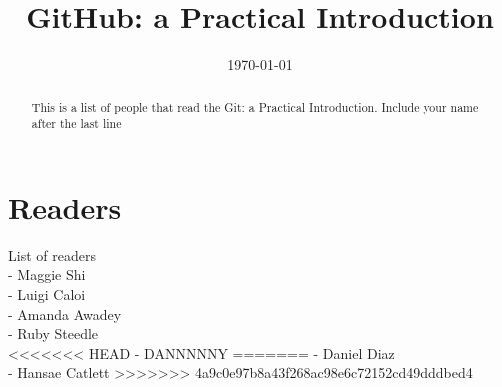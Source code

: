 \documentclass[12pt]{article}
\begin{document}
\title{GitHub: a Practical Introduction} 

\date{\today}

\maketitle 

\begin{abstract} 

	This is a list of people that read the Git: a Practical Introduction. Include your name after the last line
	
\end{abstract}

\section{Readers}
List of readers \\
- Maggie Shi \\
- Luigi Caloi  \\
- Amanda Awadey \\
- Ruby Steedle \\
<<<<<<< HEAD
- DANNNNNY
=======
- Daniel Diaz \\
- Hansae Catlett
>>>>>>> 4a9c0e97b8a43f268ac98e6c72152cd49dddbed4
	 
\end{document}
